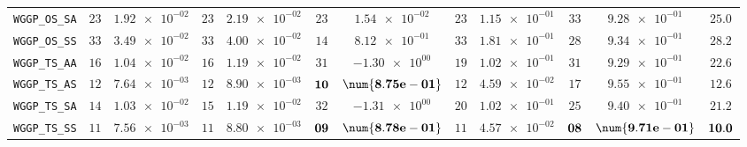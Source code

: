 \begin{xltabular}{\textwidth}{l||cC|cC|cC|cC|cC||c}
	\texttt{WGGP\_OS\_SA} & $ 23$ & $ \num{1.92e-02}$ & $ 23$ & $ \num{2.19e-02}$ & $ 23$ & $ \num{1.54e-02}$ & $ 23$ & $ \num{1.15e-01}$ & $ 33$ & $ \num{9.28e-01}$ & $ 25.0$  \\
	\texttt{WGGP\_OS\_SS} & $ 33$ & $ \num{3.49e-02}$ & $ 33$ & $ \num{4.00e-02}$ & $ 14$ & $ \num{8.12e-01}$ & $ 33$ & $ \num{1.81e-01}$ & $ 28$ & $ \num{9.34e-01}$ & $ 28.2$  \\
	\texttt{WGGP\_TS\_AA} & $ 16$ & $ \num{1.04e-02}$ & $ 16$ & $ \num{1.19e-02}$ & $ 31$ & $ \num{-1.30e+00}$ & $ 19$ & $ \num{1.02e-01}$ & $ 31$ & $ \num{9.29e-01}$ & $ 22.6$  \\
	\texttt{WGGP\_TS\_AS} & $ 12$ & $ \num{7.64e-03}$ & $ 12$ & $ \num{8.90e-03}$ & $\bf 10$ & $\bf \num{8.75e-01}$ & $ 12$ & $ \num{4.59e-02}$ & $ 17$ & $ \num{9.55e-01}$ & $ 12.6$  \\
	\texttt{WGGP\_TS\_SA} & $ 14$ & $ \num{1.03e-02}$ & $ 15$ & $ \num{1.19e-02}$ & $ 32$ & $ \num{-1.31e+00}$ & $ 20$ & $ \num{1.02e-01}$ & $ 25$ & $ \num{9.40e-01}$ & $ 21.2$  \\
	\texttt{WGGP\_TS\_SS} & $ 11$ & $ \num{7.56e-03}$ & $ 11$ & $ \num{8.80e-03}$ & $\bf 09$ & $\bf \num{8.78e-01}$ & $ 11$ & $ \num{4.57e-02}$ & $\bf 08$ & $\bf \num{9.71e-01}$ & $\bf 10.0$  \\
\end{xltabular}
